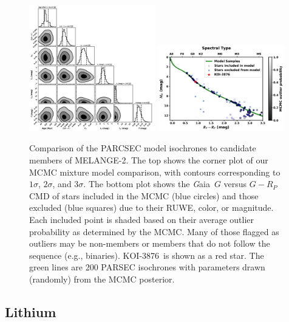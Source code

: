 \documentclass[twocolumn]{aastex631}
\newcommand{\starname}{KOI-3876}
\newcommand{\gaia}{{\textit Gaia}}
\newcommand{\association}{MELANGE-2}
\begin{document}
\begin{figure}[tb]
    \centering
    \includegraphics[width=0.49\textwidth]{cornerhybrid_parsec_bprp_g_edr3.pdf}
    \includegraphics[width=0.49\textwidth]{CMDcoloroutlierhybrid_parsec_bprp_g_edr3.pdf}
    \caption{Comparison of the PARCSEC model isochrones to candidate members of \association. The top shows the corner plot of our MCMC mixture model comparison, with contours corresponding to $1\sigma$, $2\sigma$, and $3\sigma$. The bottom plot shows the \gaia\ $G$ versus $G-R_P$ CMD of stars included in the MCMC (blue circles) and those excluded (blue squares) due to their RUWE, color, or magnitude. Each included point is shaded based on their average outlier probability as determined by the MCMC. Many of those flagged as outliers may be non-members or members that do not follow the sequence (e.g., binaries). \starname\ is shown as a red star. The green lines are 200 PARSEC isochrones with parameters drawn (randomly) from the MCMC posterior.  }
    \label{fig:isochrone}
\end{figure} 



\subsection{Lithium}
\end{document}
